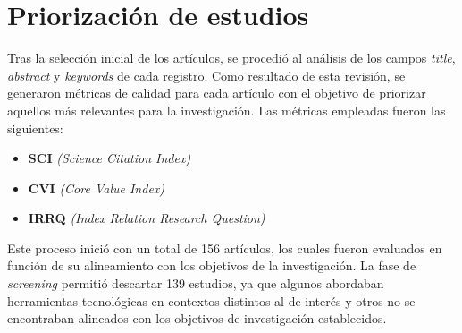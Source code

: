\section{Priorización de estudios}\label{sec:priorizacion-estudios}

Tras la selección inicial de los artículos, se procedió al análisis de los campos \textit{title}, \textit{abstract} y \textit{keywords} de cada registro. Como resultado de esta revisión, se generaron métricas de calidad para cada artículo con el objetivo de priorizar aquellos más relevantes para la investigación. Las métricas empleadas fueron las siguientes:

\begin{itemize}
	\item \textbf{SCI} \textit{(Science Citation Index)}
	\item \textbf{CVI} \textit{(Core Value Index)}
	\item \textbf{IRRQ} \textit{(Index Relation Research Question)}
\end{itemize}

Este proceso inició con un total de 156 artículos, los cuales fueron evaluados en función de su alineamiento con los objetivos de la investigación. La fase de \textit{screening} permitió descartar 139 estudios, ya que algunos abordaban herramientas tecnológicas en contextos distintos al de interés y otros no se encontraban alineados con los objetivos de investigación establecidos.
